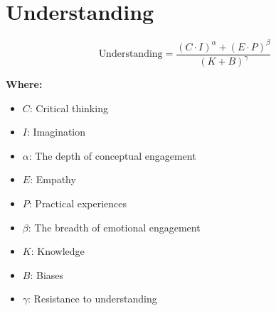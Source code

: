 \chapter{Understanding}

\begin{equation}
\text{Understanding} = \frac{(C \cdot I)^\alpha + (E \cdot P)^\beta}{(K + B)^\gamma}
\end{equation}

\textbf{Where:}

\begin{itemize}
    \item $C$: Critical thinking
    \item $I$: Imagination
    \item $\alpha$: The depth of conceptual engagement
    \item $E$: Empathy
    \item $P$: Practical experiences
    \item $\beta$: The breadth of emotional engagement
    \item $K$: Knowledge
    \item $B$: Biases
    \item $\gamma$: Resistance to understanding
\end{itemize}